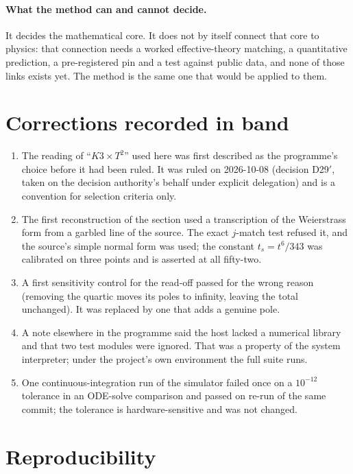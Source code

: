 \documentclass[11pt,a4paper]{article}
\theoremstyle{remark}
\begin{document}
\paragraph{What the method can and cannot decide.} It decides the mathematical core. It does not by itself connect that core to
physics: that connection needs a worked effective-theory matching, a quantitative prediction, a pre-registered pin and a test against
public data, and none of those links exists yet. The method is the same one that would be applied to them.

\section{Corrections recorded in band}\label{sec:corrections}

\begin{correctionbox}
\begin{enumerate}
\item The reading of ``$K3\times T^2$'' used here was first described as the programme's choice before it had been ruled. It was
  ruled on 2026-10-08 (decision D29$'$, taken on the decision authority's behalf under explicit delegation) and is a convention for
  selection criteria only.
\item The first reconstruction of the section used a transcription of the Weierstrass form from a garbled line of the source. The
  exact $j$-match test refused it, and the source's simple normal form was used; the constant $t_s=t^6/343$ was calibrated on three
  points and is asserted at all fifty-two.
\item A first sensitivity control for the read-off passed for the wrong reason (removing the quartic moves its poles to infinity,
  leaving the total unchanged). It was replaced by one that adds a genuine pole.
\item A note elsewhere in the programme said the host lacked a numerical library and that two test modules were ignored. That was a
  property of the system interpreter; under the project's own environment the full suite runs.
\item One continuous-integration run of the simulator failed once on a $10^{-12}$ tolerance in an ODE-solve comparison and passed on
  re-run of the same commit; the tolerance is hardware-sensitive and was not changed.
\end{enumerate}
\end{correctionbox}

\section{Reproducibility}
\end{document}
